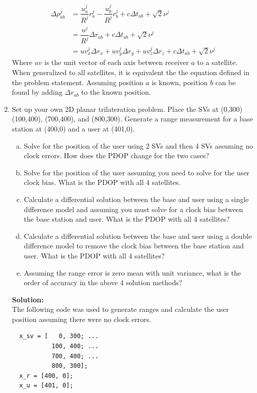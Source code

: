 \documentclass[11pt]{article}
\newcommand{\solution}{\textbf{Solution: \\}}
\begin{document}
\begin{enumerate}[label=\textbf{\arabic*.}]
  \begin{equation*}
    \begin{split}
      \Delta\rho_{ab}^j &= \dfrac{u_a^j}{R^j}r_a^j - \dfrac{u_b^j}{R^j}r_b^j  + c\Delta t_{ab} + \sqrt{2}\nu^j \\
      &= \dfrac{u^j}{R^j}\Delta r_{ab} + c\Delta t_{ab} + \sqrt{2}\nu^j \\
      &= uv_x^j\Delta r_x + uv_y^j\Delta r_y + uv_z^j\Delta r_z + c\Delta t_{ab} + \sqrt{2}\nu^j
    \end{split}
  \end{equation*}
  Where $uv$ is the unit vector of each axis between receiver $a$ to a satellite. 
  When generalized to all satellites, it is equivalent the the equation defined 
  in the problem statement. Assuming position $a$ is known, position $b$ can 
  be found by adding $\Delta r_{ab}$ to the known position.

  \vspace{24pt}
  \item Set up your own 2D planar trilateration problem. Place the SVs at 
  (0,300) (100,400), (700,400), and (800,300). Generate a range measurement 
  for a base station at (400,0) and a user at (401,0).
  \begin{enumerate}[(a)]
    \itemsep -2pt
    \item Solve for the position of the user using 2 SVs and then 4 SVs 
    assuming no clock errors. How does the PDOP change for the two cases?
    \item Solve for the position of the user assuming you need to solve for 
    the user clock bias. What is the PDOP with all 4 satellites.
    \item Calculate a differential solution between the base and user using 
    a single difference model and assuming you must solve for a clock bias 
    between the base station and user. What is the PDOP with all 4 satellites?
    \item Calculate a differential solution between the base and user using a 
    double difference model to remove the clock bias between the base station 
    and user. What is the PDOP with all 4 satellites?
    \item Assuming the range error is zero mean with unit variance, what is 
    the order of accuracy in the above 4 solution methods?
  \end{enumerate}
  \solution
  The following code was used to generate ranges and calculate the user position 
  assuming there were no clock errors.
  \begin{lstlisting}
  x_sv = [   0, 300; ...
           100, 400; ...
           700, 400; ...
           800, 300];
  x_r = [400, 0];
  x_u = [401, 0];


\end{lstlisting}
\end{enumerate}
\end{document}
